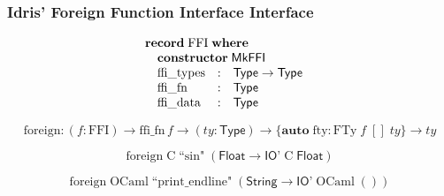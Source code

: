 \documentclass[aspectratio=169]{beamer}
\begin{document}
\begin{frame}[t]
  \frametitle{Idris' Foreign Function Interface Interface}

  \begin{displaymath}
    \begin{array}{@{}l}
      \textbf{record}\;\mathrm{FFI}\;\textbf{where} \\
      \quad \textbf{constructor}\;\textsf{MkFFI} \\
      \quad
      \begin{array}{@{}lcl}
        \mathrm{ffi\_types}&:&\textsf{Type} \to \textsf{Type} \\
        \mathrm{ffi\_fn}&:&\textsf{Type} \\
        \mathrm{ffi\_data}&:&\textsf{Type}
      \end{array}
    \end{array}
  \end{displaymath}

  \bigskip
  \pause

  \begin{displaymath}
    \mathrm{foreign} : (f : \mathrm{FFI}) \to \mathrm{ffi\_fn}\,f \to (\mathit{ty} : \textsf{Type}) \to \{\textbf{auto}\;\mathrm{fty} : \mathrm{FTy}\;f\;[]\;\mathit{ty}\} \to \mathit{ty}
  \end{displaymath}

  \bigskip
  \pause

  \begin{displaymath}
    \mathrm{foreign}\;\mathrm{C}\;\textrm{``sin"}\;(\textsf{Float} \to \textsf{IO'}\;\mathrm{C}\;\textsf{Float})
  \end{displaymath}

  \pause

  \begin{displaymath}
    \mathrm{foreign}\;\mathrm{OCaml}\;\textrm{``print\_endline"}\;(\textsf{String} \to \textsf{IO'}\;\mathrm{OCaml}\;())
  \end{displaymath}
\end{frame}
\end{document}
